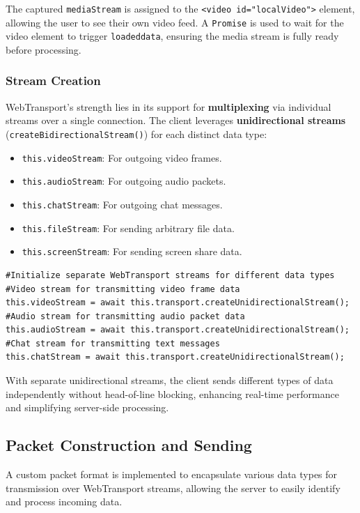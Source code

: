 The captured \texttt{mediaStream} is assigned to the \texttt{<video id="localVideo">} element, allowing the user to see their own video feed. A \texttt{Promise} is used to wait for the video element to trigger \texttt{loadeddata}, ensuring the media stream is fully ready before processing.

\subsubsection{Stream Creation}
WebTransport's strength lies in its support for \textbf{multiplexing} via individual streams over a single connection. The client leverages \textbf{unidirectional streams} (\texttt{create\allowbreak{}Bidirectional\allowbreak{}Stream()}) for each distinct data type:

\begin{itemize}
    \item \texttt{this.videoStream}: For outgoing video frames.
    \item \texttt{this.audioStream}: For outgoing audio packets.
    \item \texttt{this.chatStream}: For outgoing chat messages.
    \item \texttt{this.fileStream}: For sending arbitrary file data.
    \item \texttt{this.screenStream}: For sending screen share data.
\end{itemize}

\begin{lstlisting}[breaklines=true,basicstyle=\small\ttfamily,frame=single]
#Initialize separate WebTransport streams for different data types
#Video stream for transmitting video frame data
this.videoStream = await this.transport.createUnidirectionalStream();
#Audio stream for transmitting audio packet data  
this.audioStream = await this.transport.createUnidirectionalStream();
#Chat stream for transmitting text messages
this.chatStream = await this.transport.createUnidirectionalStream();
\end{lstlisting}

With separate unidirectional streams, the client sends different types of data independently without head-of-line blocking, enhancing real-time performance and simplifying server-side processing.

\subsection{Packet Construction and Sending}
A custom packet format is implemented to encapsulate various data types for transmission over WebTransport streams, allowing the server to easily identify and process incoming data.

